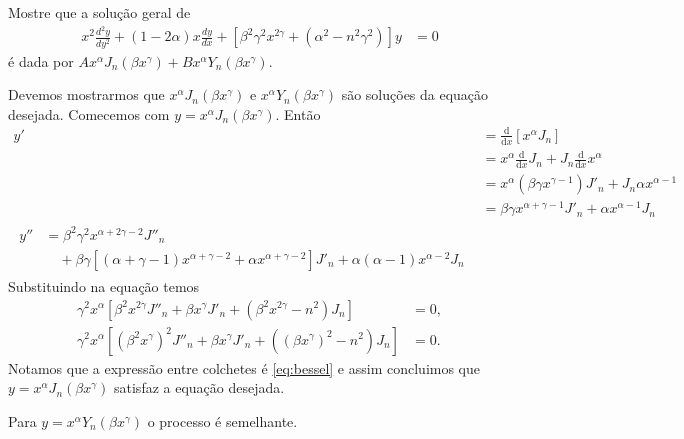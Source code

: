 \documentclass[a4paper,12pt, leqno, answers]{exam}
\begin{document}
\begin{questions}
     Mostre que a solu\c{c}\~{a}o geral de
    \begin{align*}
        x^2 \frac{d^2y}{dy^2} + (1 - 2\alpha)x\frac{dy}{dx} + \left[ \beta^2 \gamma^2 x^{2\gamma} + (\alpha^2 - n^2 \gamma^2) \right]y &= 0
    \end{align*}
    \'{e} dada por $A x^\alpha J_n(\beta x^\gamma) + B x^\alpha Y_n(\beta x^\gamma)$.
    \begin{solution}
        Devemos mostrarmos que $x^\alpha J_n(\beta x^\gamma)$ e $x^\alpha Y_n(\beta x^\gamma)$ s\~{a}o solu\c{c}\~{o}es da equa\c{c}\~{a}o desejada. Comecemos com $y = x^\alpha J_n(\beta x^\gamma)$. Ent\~{a}o
        \begin{align*}
            y' &= \frac{\mathrm{d}}{\mathrm{d}x} \left[ x^\alpha J_n \right] \\
            &= x^\alpha \frac{\mathrm{d}}{\mathrm{d}x} J_n + J_n \frac{\mathrm{d}}{\mathrm{d}x} x^\alpha \\
            &= x^\alpha (\beta \gamma x^{\gamma - 1}) J'_n + J_n \alpha x^{\alpha - 1} \\
            &= \beta \gamma x^{\alpha + \gamma - 1} J'_n + \alpha x^{\alpha - 1} J_n \\
            \begin{split}
                y'' &= \beta^2 \gamma^2 x^{\alpha + 2 \gamma - 2} J''_n \\ &\quad {}+ \beta \gamma \left[ (\alpha + \gamma - 1) x^{\alpha + \gamma - 2} + \alpha x^{\alpha + \gamma - 2} \right] J'_n + \alpha (\alpha - 1) x^{\alpha - 2} J_n
            \end{split}
        \end{align*}
        Substituindo na equa\c{c}\~{a}o temos
        \begin{align*}
            \gamma^2 x^\alpha \left[ \beta^2 x^{2 \gamma} J''_n + \beta x^\gamma J'_n + (\beta^2 x^{2\gamma} - n^2) J_n \right] &= 0,\\
            \gamma^2 x^\alpha \left[ (\beta^2 x^\gamma)^2 J''_n + \beta x^\gamma J'_n + ( (\beta x^\gamma)^2 - n^2) J_n \right] &= 0.
        \end{align*}
        Notamos que a express\~{a}o entre colchetes \'{e} \eqref{eq:bessel} e assim concluimos que $y = x^\alpha J_n(\beta x^\gamma)$ satisfaz a equa\c{c}\~{a}o desejada.

        Para $y = x^\alpha Y_n(\beta x^\gamma)$ o processo \'{e} semelhante.
    \end{solution}


\end{questions}
\end{document}
